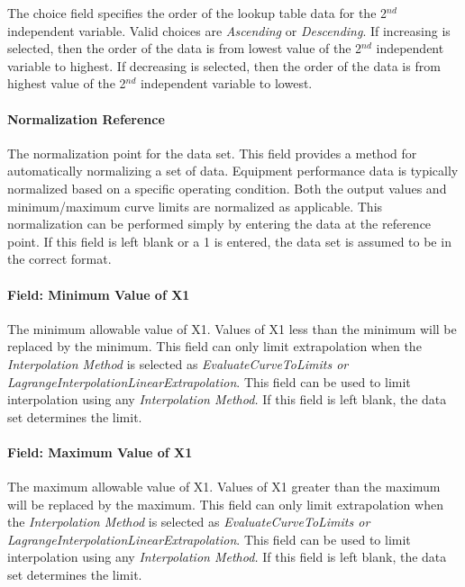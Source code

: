 The choice field specifies the order of the lookup table data for the 2\(^{nd}\) independent variable. Valid choices are \emph{Ascending} or \emph{Descending}. If increasing is selected, then the order of the data is from lowest value of the 2\(^{nd}\) independent variable to highest. If decreasing is selected, then the order of the data is from highest value of the 2\(^{nd}\) independent variable to lowest.

\paragraph{Normalization Reference}\label{field-normalization-reference-2}

The normalization point for the data set. This field provides a method for automatically normalizing a set of data. Equipment performance data is typically normalized based on a specific operating condition. Both the output values and minimum/maximum curve limits are normalized as applicable. This normalization can be performed simply by entering the data at the reference point. If this field is left blank or a 1 is entered, the data set is assumed to be in the correct format.

\paragraph{Field: Minimum Value of X1}\label{field-minimum-value-of-x1}

The minimum allowable value of X1. Values of X1 less than the minimum will be replaced by the minimum. This field can only limit extrapolation when the \emph{Interpolation Method} is selected as \emph{EvaluateCurveToLimits or LagrangeInterpolationLinearExtrapolation}. This field can be used to limit interpolation using any \emph{Interpolation Method.} If this field is left blank, the data set determines the limit.

\paragraph{Field: Maximum Value of X1}\label{field-maximum-value-of-x1}

The maximum allowable value of X1. Values of X1 greater than the maximum will be replaced by the maximum. This field can only limit extrapolation when the \emph{Interpolation Method} is selected as \emph{EvaluateCurveToLimits or LagrangeInterpolationLinearExtrapolation}. This field can be used to limit interpolation using any \emph{Interpolation Method.} If this field is left blank, the data set determines the limit.

